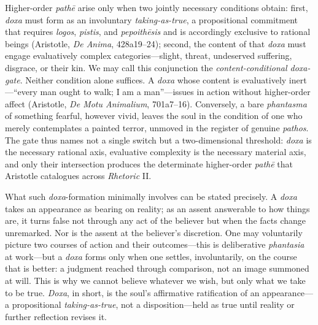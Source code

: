 \documentclass{article}
\begin{document}
Higher-order \textit{pathē} arise only when two jointly necessary conditions obtain: first, \textit{doxa} must form as an involuntary \textit{taking-as-true}, a propositional commitment that requires \textit{logos}, \textit{pistis}, and \textit{pepoithēsis} and is accordingly exclusive to rational beings (Aristotle, \textit{De Anima}, 428a19--24); second, the content of that \textit{doxa} must engage evaluatively complex categories---slight, threat, undeserved suffering, disgrace, or their kin. We may call this conjunction the \textit{content-conditional doxa-gate}. Neither condition alone suffices. A \textit{doxa} whose content is evaluatively inert---``every man ought to walk; I am a man''---issues in action without higher-order affect (Aristotle, \textit{De Motu Animalium}, 701a7--16). Conversely, a bare \textit{phantasma} of something fearful, however vivid, leaves the soul in the condition of one who merely contemplates a painted terror, unmoved in the register of genuine \textit{pathos}. The gate thus names not a single switch but a two-dimensional threshold: \textit{doxa} is the necessary rational axis, evaluative complexity is the necessary material axis, and only their intersection produces the determinate higher-order \textit{pathē} that Aristotle catalogues across \textit{Rhetoric} II.

What such \textit{doxa}-formation minimally involves can be stated precisely. A \textit{doxa} takes an appearance as bearing on reality; as an assent answerable to how things are, it turns false not through any act of the believer but when the facts change unremarked. Nor is the assent at the believer's discretion. One may voluntarily picture two courses of action and their outcomes---this is deliberative \textit{phantasia} at work---but a \textit{doxa} forms only when one settles, involuntarily, on the course that is better: a judgment reached through comparison, not an image summoned at will. This is why we cannot believe whatever we wish, but only what we take to be true. \textit{Doxa}, in short, is the soul's affirmative ratification of an appearance---a propositional \textit{taking-as-true}, not a disposition---held as true until reality or further reflection revises it.
\end{document}
